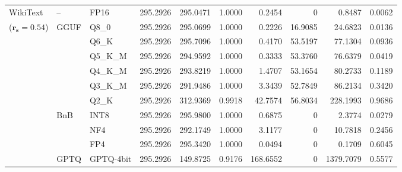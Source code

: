 \begin{table}[t]
{\begin{tabular}{ll l rrrrrrr}
\midrule
WikiText & -- & FP16 & 295.2926 & 295.0471 & 1.0000 & 0.2454 & \cellcolor{cyan!12} $0$ & 0.8487 & 0.0062 \\
{\small ($\mathbf{r_s{=}0.54}$)} & GGUF & Q8\_0 & 295.2926 & 295.0699 & 1.0000 & 0.2226 & 16.9085 & 24.6823 & 0.0136 \\
 &  & Q6\_K & 295.2926 & 295.7096 & 1.0000 & 0.4170 & 53.5197 & 77.1304 & 0.0936 \\
 &  & Q5\_K\_M & 295.2926 & 294.9592 & 1.0000 & 0.3333 & 53.3760 & 76.6379 & 0.0419 \\
 &  & Q4\_K\_M & 295.2926 & 293.8219 & 1.0000 & 1.4707 & 53.1654 & 80.2733 & 0.1189 \\
 &  & Q3\_K\_M & 295.2926 & 291.9486 & 1.0000 & 3.3439 & 52.7849 & 86.2134 & 0.3420 \\
 &  & Q2\_K & 295.2926 & 312.9369 & 0.9918 & 42.7574 & 56.8034 & 228.1993 & 0.9686 \\
 & BnB & INT8 & 295.2926 & 295.9800 & 1.0000 & 0.6875 & \cellcolor{cyan!12} $0$ & 2.3774 & 0.0279 \\
 &  & NF4 & 295.2926 & 292.1749 & 1.0000 & 3.1177 & \cellcolor{cyan!12} $0$ & 10.7818 & 0.2456 \\
 &  & FP4 & 295.2926 & 295.3420 & 1.0000 & 0.0494 & \cellcolor{cyan!12} $0$ & 0.1709 & 0.6045 \\
 & GPTQ & GPTQ-4bit & 295.2926 & 149.8725 & \cellcolor{red!18} 0.9176 & \cellcolor{red!18} 168.6552 & \cellcolor{cyan!12} $0$ & \cellcolor{red!18} 1379.7079 & \cellcolor{red!18} 0.5577 \\
\bottomrule
\end{tabular}}
\end{table}